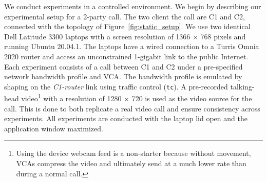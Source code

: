 We conduct experiments in a controlled environment.
We begin by describing our experimental setup for a 2-party call.
The two client the call are C1 and C2,
  connected with the topology of Figure~\ref{fig:static_setup}.
We use two identical Dell Latitude 3300 laptops with a screen resolution of 1366 $\times$ 768 pixels and running Ubuntu 20.04.1. The laptops have a wired connection to a Turris Omnia 2020
router and access an unconstrained 1-gigabit link to the public Internet.
Each experiment consists of a call between C1 and C2 under a pre-specified network bandwidth profile and VCA. The bandwidth profile is emulated by shaping on the \textit{C1-router} link using traffic control (\texttt{tc}). A
pre-recorded talking-head video\footnote{Using the device webcam feed is a non-starter because without movement, VCAs compress the video and ultimately send at a much
lower rate than during a normal call.} with a resolution of 1280 $\times$ 720 is used as the video source for the call. This is done to both replicate a real video call
and ensure consistency across experiments. All experiments are conducted with the laptop lid open and the application window maximized. %

